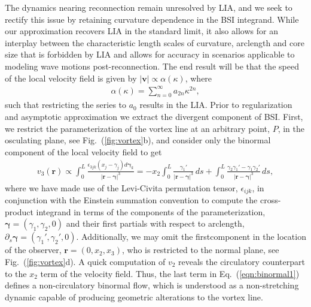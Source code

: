 \documentclass[aps,graphicx,reprint,onecolumn,12pt,tightenlines,longbibliography]{revtex4-1}
\newcommand{\sas}[2]{{#2}}
\begin{document}
The dynamics nearing reconnection remain unresolved by LIA, and we seek to rectify this issue by retaining curvature dependence in the BSI integrand. While our approximation recovers LIA in the standard limit, it also allows for an interplay between the characteristic length scales of curvature, arclength and core size that is forbidden by LIA and allows for accuracy in scenarios applicable to modeling wave motions post-reconnection. \sas{}{The end result will be that the speed of the local velocity field is given by $|\bm{v}| \propto \alpha(\kappa)$, where}
%
\begin{align}\label{eqn:alpha}
 \alpha(\kappa) = \sum_{n=0}^{\infty} a_{2n}\kappa^{2n},
\end{align}
\sas{}{such that restricting the series to $a_{0}$ results in the LIA. Prior to regularization and asymptotic approximation we extract the divergent component of BSI.} First, we restrict the parameterization of the vortex line at an arbitrary point, $P$, in the osculating plane, see  Fig.~(\ref{fig:vortex}b), and consider only the binormal component of the local velocity field to get 
%
\begin{align}\label{eqn:binormal1}
 v_{3}(\textbf{r})  \propto \int_{0}^{L} \frac{\epsilon_{3jk}(x_{j}-\gamma_{j})d\bm{\gamma}_{k}}{|\textbf{r}-\bm{\gamma}|^{3}} = -x_{2}\int_{0}^{L} \frac{\gamma_{1}'}{|\textbf{r}-\bm{\gamma}|^{3}}\, ds   +\int_{0}^{L} \frac{\gamma_{2}\gamma_{1}'-\gamma_{1}\gamma_{2}'}{|\textbf{r}-\bm{\gamma}|^{3}}\, ds,
\end{align}
%
where we have made use of the Levi-Civita permutation tensor\sas{}{, $\epsilon_{ijk}$,} in conjunction with the Einstein summation convention to compute the cross-product integrand in terms of the components of the parameterization, $\bm{\gamma} = (\gamma_{1}, \gamma_{2},0)$ and their first partials with respect to arclength, $\partial_{s}\bm{\gamma} = (\gamma_{1}', \gamma_{2}',0)$.  Additionally, we may omit the first\sas{-}{}component in the location of the observer, $\textbf{r}=(0,x_2,x_3)$, who is restricted to the normal plane, see Fig.~(\ref{fig:vortex}d). A quick computation of ${v}_{2}$ reveals the circulatory counterpart to the $x_{2}$ term of the velocity field. Thus, the last term in Eq.~(\ref{eqn:binormal1}) defines a non-circulatory binormal flow, which is understood as a non-stretching dynamic capable of producing  geometric alterations to the vortex line.
\end{document}

